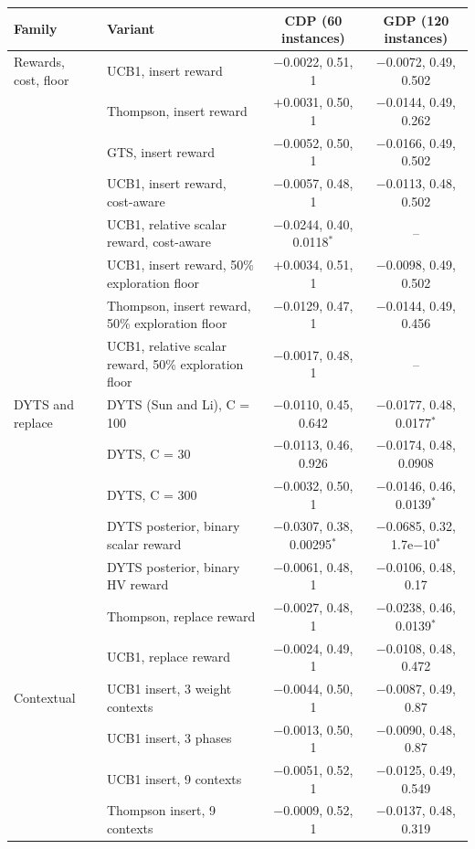 \documentclass[final,3p,times,11pt,authoryear]{elsarticle}
\begin{document}
\begin{center}
\footnotesize
\setlength{\tabcolsep}{4pt}
\begin{tabularx}{\linewidth}{lXcc}
\toprule
Family & Variant & CDP (60 instances) & GDP (120 instances) \\
\midrule
Rewards, cost, floor & UCB1, insert reward & $-$0.0022, 0.51, 1 & $-$0.0072, 0.49, 0.502 \\
 & Thompson, insert reward & +0.0031, 0.50, 1 & $-$0.0144, 0.49, 0.262 \\
 & GTS, insert reward & $-$0.0052, 0.50, 1 & $-$0.0166, 0.49, 0.502 \\
 & UCB1, insert reward, cost-aware & $-$0.0057, 0.48, 1 & $-$0.0113, 0.48, 0.502 \\
 & UCB1, relative scalar reward, cost-aware & $-$0.0244, 0.40, 0.0118$^{*}$ & -- \\
 & UCB1, insert reward, 50\% exploration floor & +0.0034, 0.51, 1 & $-$0.0098, 0.49, 0.502 \\
 & Thompson, insert reward, 50\% exploration floor & $-$0.0129, 0.47, 1 & $-$0.0144, 0.49, 0.456 \\
 & UCB1, relative scalar reward, 50\% exploration floor & $-$0.0017, 0.48, 1 & -- \\
DYTS and replace & DYTS (Sun and Li), C = 100 & $-$0.0110, 0.45, 0.642 & $-$0.0177, 0.48, 0.0177$^{*}$ \\
 & DYTS, C = 30 & $-$0.0113, 0.46, 0.926 & $-$0.0174, 0.48, 0.0908 \\
 & DYTS, C = 300 & $-$0.0032, 0.50, 1 & $-$0.0146, 0.46, 0.0139$^{*}$ \\
 & DYTS posterior, binary scalar reward & $-$0.0307, 0.38, 0.00295$^{*}$ & $-$0.0685, 0.32, 1.7e$-$10$^{*}$ \\
 & DYTS posterior, binary HV reward & $-$0.0061, 0.48, 1 & $-$0.0106, 0.48, 0.17 \\
 & Thompson, replace reward & $-$0.0027, 0.48, 1 & $-$0.0238, 0.46, 0.0139$^{*}$ \\
 & UCB1, replace reward & $-$0.0024, 0.49, 1 & $-$0.0108, 0.48, 0.472 \\
Contextual & UCB1 insert, 3 weight contexts & $-$0.0044, 0.50, 1 & $-$0.0087, 0.49, 0.87 \\
 & UCB1 insert, 3 phases & $-$0.0013, 0.50, 1 & $-$0.0090, 0.48, 0.87 \\
 & UCB1 insert, 9 contexts & $-$0.0051, 0.52, 1 & $-$0.0125, 0.49, 0.549 \\
 & Thompson insert, 9 contexts & $-$0.0009, 0.52, 1 & $-$0.0137, 0.48, 0.319 \\

\end{tabularx}
\end{center}
\end{document}
